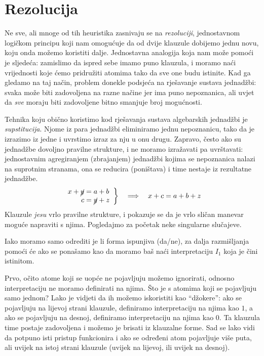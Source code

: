 \section{Rezolucija}

Ne sve, ali mnoge od tih heuristika zasnivaju se na \emph{rezoluciji}, jednostavnom logičkom principu koji nam omogućuje da od dvije klauzule dobijemo jednu novu, koju onda možemo koristiti dalje. Jednostavna analogija koja nam može pomoći je sljedeća: zamislimo da ispred sebe imamo puno klauzula, i moramo naći vrijednosti koje ćemo pridružiti atomima tako da sve one budu istinite. Kad ga gledamo na taj način, problem donekle podsjeća na rješavanje sustava jednadžbi: svaka može biti zadovoljena na razne načine jer ima puno nepoznanica, ali uvjet da \emph{sve} moraju biti zadovoljene bitno smanjuje broj mogućnosti.

Tehnika koju obično koristimo kod rješavanja sustava algebarskih jednadžbi je \emph{supstitucija}. Njome iz para jednadžbi eliminiramo jednu nepoznanicu, tako da je izrazimo iz jedne i uvrstimo izraz za nju u onu drugu. Zapravo, često ako su jednadžbe dovoljno pravilne strukture, i ne moramo izražavati pa uvrštavati: jednostavnim agregiranjem (zbrajanjem) jednadžbi kojima se nepoznanica nalazi na suprotnim stranama, ona se reducira (po\-ni\-šta\-va) i time nestaje iz rezultatne jednadžbe.
$$\left.\begin{array}{r@{\;=\;}l}x+\cancel{y}&a+b\\c&\cancel{y}+z\end{array}\right\}\quad\Longrightarrow\quad x + c = a + b + z$$
Klauzule \emph{jesu} vrlo pravilne strukture, i pokazuje se da je vrlo sličan manevar moguće napraviti s njima. Pogledajmo za početak neke singularne slučajeve.

Iako moramo samo odrediti je li forma ispunjiva (da/ne), za dalja raz\-miš\-lja\-nja pomoći će ako se ponašamo kao da moramo baš naći interpretaciju $I_1$ koja je čini istinitom.

Prvo, očito atome koji se uopće ne pojavljuju možemo ignorirati, odnosno interpretaciju ne moramo definirati na njima. Što je s atomima koji se pojavljuju samo jednom? Lako je vidjeti da ih možemo iskoristiti kao ``džokere'': ako se pojavljuju na lijevoj strani klauzule, definiramo interpretaciju na njima kao $1$, a ako se pojavljuju na desnoj, definiramo interpretaciju na njima kao $0$. Ta klauzula time postaje zadovoljena i možemo je brisati iz klauzalne forme. Sad se lako vidi da potpuno isti pristup funkcionira i ako se određeni atom pojavljuje više puta, ali uvijek na istoj strani klauzule (uvijek na lijevoj, ili uvijek na desnoj).


